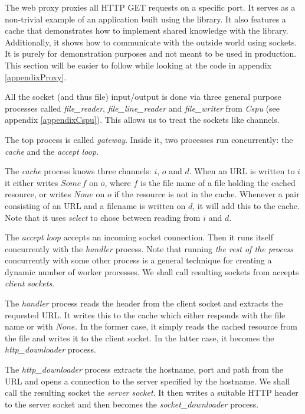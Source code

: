 \documentclass[a4paper,12pt]{article}
\begin{document}
The web proxy proxies all HTTP GET requests on a specific port. It serves as a
non-trivial example of an application built using the library. It also features
a cache that demonstrates how to implement shared knowledge with the library.
Additionally, it shows how to communicate with the outside world using sockets.
It is purely for demonstration purposes and not meant to be used in production.
This section will be easier to follow while looking at the code in appendix
\ref{appendixProxy}.

All the socket (and thus file) input/output is done via three general purpose
processes called \emph{file\_reader}, \emph{file\_line\_reader} and
\emph{file\_writer} from \emph{Cspu} (see appendix \ref{appendixCspu}). This
allows us to treat the sockets like channels.

The top process is called \emph{gateway}. Inside it, two processes run
concurrently: the \emph{cache} and the \emph{accept loop}.

The \emph{cache} process knows three channels: $i$, $o$ and $d$. When an URL is
written to $i$ it either writes $Some\,f$ on $o$, where $f$ is the file name of
a file holding the cached resource, or writes $None$ on $o$ if the resource is
not in the cache. Whenever a pair consisting of an URL and a filename is
written on $d$, it will add this to the cache. Note that it uses \emph{select}
to chose between reading from $i$ and $d$.

The \emph{accept loop} accepts an incoming socket connection. Then it runs
itself concurrently with the \emph{handler} process. Note that running
\emph{the rest of the process} concurrently with some other process is a
general technique for creating a dynamic number of worker processes. We shall
call resulting sockets from accepts \emph{client sockets}.

The \emph{handler} process reads the header from the client socket and extracts
the requested URL. It writes this to the cache which either responds with the
file name or with $None$. In the former case, it simply reads the cached
resource from the file and writes it to the client socket. In the latter case,
it becomes the \emph{http\_downloader} process.

The \emph{http\_downloader} process extracts the hostname, port and path from
the URL and opens a connection to the server specified by the hostname. We
shall call the resulting socket the \emph{server socket}. It then writes a
suitable HTTP header to the server socket and then becomes the
\emph{socket\_downloader} process.
\end{document}
